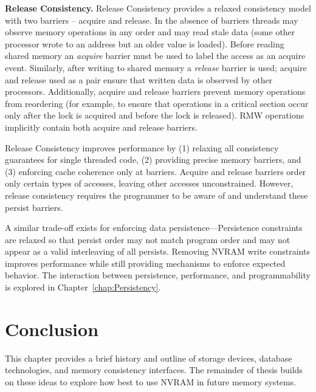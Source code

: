\textbf{Release Consistency.}
Release Consistency \cite{GharachorlooLenoski90} provides a relaxed consistency model with two barriers -- acquire and release.
In the absence of barriers threads may observe memory operations in any order and may read stale data (some other processor wrote to an address but an older value is loaded).
Before reading shared memory an \emph{acquire} barrier must be used to label the access as an acquire event.
Similarly, after writing to shared memory a \emph{release} barrier is used; acquire and release used as a pair ensure that written data is observed by other processors.
Additionally, acquire and release barriers prevent memory operations from reordering (for example, to ensure that operations in a critical section occur only after the lock is acquired and before the lock is released).
RMW operations implicitly contain both acquire and release barriers.

Release Consistency improves performance by (1) relaxing all consistency guarantees for single threaded code, (2) providing precise memory barriers, and (3) enforcing cache coherence only at barriers.
Acquire and release barriers order only certain types of accesses, leaving other accesses unconstrained.
However, release consistency requires the programmer to be aware of and understand these persist barriers.

A similar trade-off exists for enforcing data persistence---Persistence constraints are relaxed so that persist order may not match program order and may not appear as a valid interleaving of all persists.
Removing NVRAM write constraints improves performance while still providing mechanisms to enforce expected behavior.
The interaction between persistence, performance, and programmability is explored in Chapter~\ref{chap:Persistency}.

\section{Conclusion}
\label{sec:Background:Conclusion}

This chapter provides a brief history and outline of storage devices, database technologies, and memory consistency interfaces.
The remainder of thesis builds on these ideas to explore how best to use NVRAM in future memory systems.
